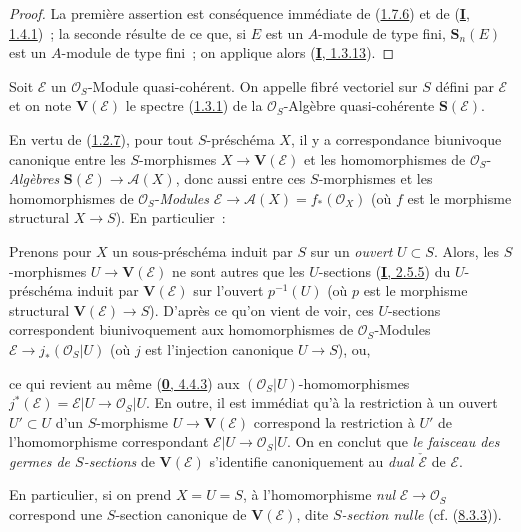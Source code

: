 \begin{proof}
La première assertion est conséquence immédiate de
(\hyperref[II.1.7.6-fr]{1.7.6}) et de
(\hyperref[I.1.4.1-fr]{\textbf{I}, 1.4.1})~; la seconde résulte de ce que, si $E$ est
un $A$-module de type fini, $\mathbf{S}_n(E)$ est un $A$-module de type
fini~; on applique alors (\hyperref[I.1.3.13-fr]{\textbf{I}, 1.3.13}).
\end{proof}

\begin{definition}[1.7.8]
\label{II.1.7.8-fr}
Soit $\mathcal{E}$ un $\mathcal{O}_S$-Module quasi-cohérent. On appelle
fibré vectoriel sur $S$ défini par $\mathcal{E}$ et on note
$\mathbf{V}(\mathcal{E})$ le spectre
\textup{(\hyperref[II.1.3.1-fr]{1.3.1})} de la $\mathcal{O}_S$-Algèbre quasi-cohérente
$\mathbf{S}(\mathcal{E})$.
\end{definition}

En vertu de (\hyperref[II.1.2.7-fr]{1.2.7}), pour tout $S$-préschéma $X$, il
y a correspondance biunivoque canonique entre les $S$-morphismes
$X\to\mathbf{V}(\mathcal{E})$ et les homomorphismes de
$\mathcal{O}_S$-\emph{Algèbres} $\mathbf{S}(\mathcal{E})\to\mathcal{A}(X)$, donc
aussi entre ces $S$-morphismes et les homomorphismes de
$\mathcal{O}_S$-\emph{Modules}
$\mathcal{E}\to\mathcal{A}(X)=f_*(\mathcal{O}_X)$ (où $f$ est le morphisme
structural $X\to S$). En particulier~:

\begin{env}[1.7.9]
\label{II.1.7.9-fr}
Prenons pour $X$ un sous-préschéma induit par $S$ sur un \emph{ouvert} $U\subset S$.
Alors, les $S$-morphismes $U\to\mathbf{V}(\mathcal{E})$ ne sont autres que
les $U$-sections (\hyperref[I.2.5.5-fr]{\textbf{I}, 2.5.5}) du $U$-préschéma induit
par $\mathbf{V}(\mathcal{E})$ sur l'ouvert $p^{-1}(U)$ (où $p$ est le
morphisme structural $\mathbf{V}(\mathcal{E})\to S$). D'après ce qu'on vient
de voir, ces $U$-sections correspondent biunivoquement aux homomorphismes de
$\mathcal{O}_S$-Modules
$\mathcal{E}\to j_*(\mathcal{O}_S|U)$ (où $j$ est l'injection canonique
$U\to S$), ou,

ce qui revient au même (\hyperref[0.4.4.3-fr]{\textbf{0}, 4.4.3}) aux
$(\mathcal{O}_S|U)$-homomorphismes
$j^*(\mathcal{E})=\mathcal{E}|U\to\mathcal{O}_S|U$. En outre, il est
immédiat qu'à la restriction à un ouvert $U'\subset U$ d'un $S$-morphisme
$U\to\mathbf{V}(\mathcal{E})$ correspond la restriction à $U'$ de
l'homomorphisme correspondant
$\mathcal{E}|U\to\mathcal{O}_S|U$. On en conclut que \emph{le faisceau des
germes de $S$-sections} de $\mathbf{V}(\mathcal{E})$ s'identifie
canoniquement au \emph{dual $\check{\mathcal{E}}$} de $\mathcal{E}$.

En particulier, si on prend $X=U=S$, à l'homomorphisme \emph{nul}
$\mathcal{E}\to\mathcal{O}_S$ correspond une $S$-section canonique de
$\mathbf{V}(\mathcal{E})$, dite \emph{$S$-section nulle}
(cf. (\hyperref[II.8.3.3-fr]{8.3.3})).
\end{env}


